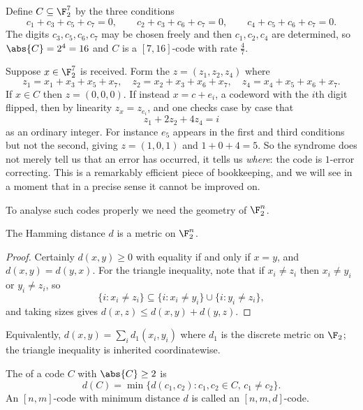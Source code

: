 \begin{example}\label{ex:ham74}
	Define $C \subseteq \F_2^7$ by the three conditions
	$$c_1 + c_3 + c_5 + c_7 = 0, \qquad c_2 + c_3 + c_6 + c_7 = 0, \qquad c_4 + c_5 + c_6 + c_7 = 0.$$
	The digits $c_3, c_5, c_6, c_7$ may be chosen freely and then $c_1, c_2, c_4$ are determined, so $\abs{C} = 2^4 = 16$ and $C$ is a $[7,16]$-code with rate $\frac47$.

	Suppose $x \in \F_2^7$ is received. Form the  $z = (z_1, z_2, z_4)$ where
	$$z_1 = x_1+x_3+x_5+x_7, \quad z_2 = x_2+x_3+x_6+x_7, \quad z_4 = x_4+x_5+x_6+x_7.$$
	If $x \in C$ then $z = (0,0,0)$. If instead $x = c + e_i$, a codeword with the $i$th digit flipped, then by linearity $z_x = z_{e_i}$, and one checks case by case that
	$$z_1 + 2z_2 + 4z_4 = i$$
	as an ordinary integer. For instance $e_5$ appears in the first and third conditions but not the second, giving $z = (1,0,1)$ and $1 + 0 + 4 = 5$. So the syndrome does not merely tell us that an error has occurred, it tells us \emph{where}: the code is $1$-error correcting. This is a remarkably efficient piece of bookkeeping, and we will see in a moment that in a precise sense it cannot be improved on.
\end{example}

To analyse such codes properly we need the geometry of $\F_2^n$.

\begin{lemma}
	The Hamming distance $d$ is a metric on $\F_2^n$.
\end{lemma}

\begin{proof}
	Certainly $d(x,y) \ge 0$ with equality if and only if $x = y$, and $d(x,y) = d(y,x)$. For the triangle inequality, note that if $x_i \ne z_i$ then $x_i \ne y_i$ or $y_i \ne z_i$, so
	$$\{i : x_i \ne z_i\} \subseteq \{i : x_i \ne y_i\} \cup \{i : y_i \ne z_i\},$$
	and taking sizes gives $d(x,z) \le d(x,y) + d(y,z)$.
\end{proof}

Equivalently, $d(x,y) = \sum_i d_1(x_i,y_i)$ where $d_1$ is the discrete metric on $\F_2$; the triangle inequality is inherited coordinatewise.

\begin{definition}
	The  of a code $C$ with $\abs{C} \ge 2$ is
	$$d(C) = \min\{d(c_1,c_2) : c_1, c_2 \in C, \, c_1 \ne c_2\}.$$
	An $[n,m]$-code with minimum distance $d$ is called an $[n,m,d]$-code.
\end{definition}

